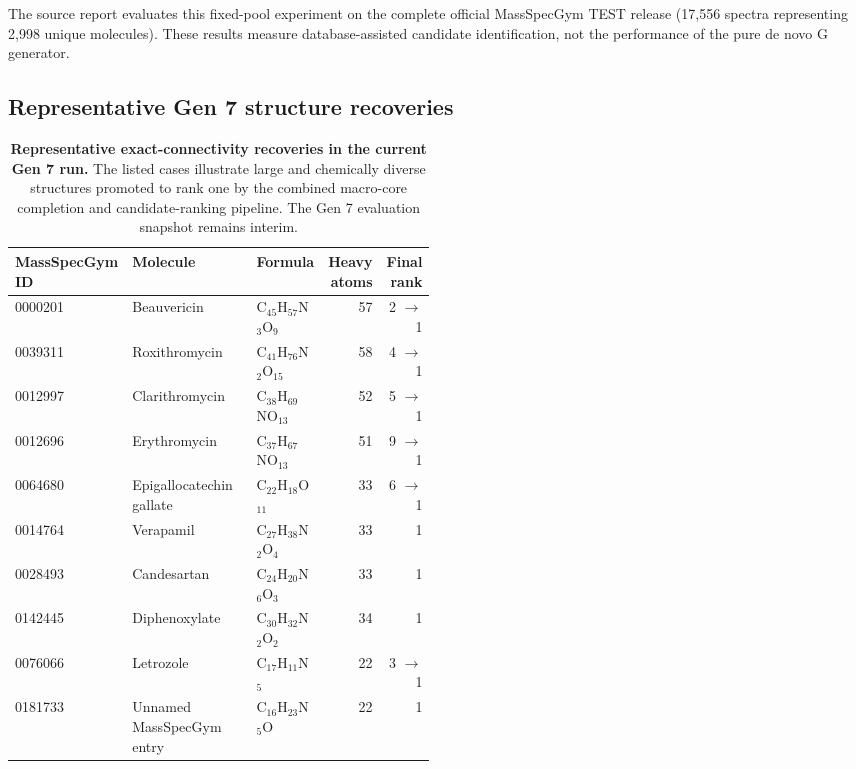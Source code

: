The source report evaluates this fixed-pool experiment on the complete official
MassSpecGym TEST release (17,556 spectra representing 2,998 unique molecules).
These results measure database-assisted candidate identification, not the
performance of the pure de novo G generator.

\subsection{Representative Gen 7 structure recoveries}

\begin{table}[!htbp]
\centering
\caption{\textbf{Representative exact-connectivity recoveries in the current Gen 7 run.}
The listed cases illustrate large and chemically diverse structures promoted to
rank one by the combined macro-core completion and candidate-ranking pipeline.
The Gen 7 evaluation snapshot remains interim.}
\label{tab:gen7_landmark_cases}
\small
\setlength{\tabcolsep}{2.5pt}

\begin{tabular}{@{}p{0.19\linewidth}p{0.30\linewidth}lrr@{}}
\toprule
MassSpecGym ID & Molecule & Formula & Heavy atoms & Final rank \\
\midrule
0000201 & Beauvericin & C$_{45}$H$_{57}$N$_3$O$_9$ & 57 & 2 $\rightarrow$ 1 \\
0039311 & Roxithromycin & C$_{41}$H$_{76}$N$_2$O$_{15}$ & 58 & 4 $\rightarrow$ 1 \\
0012997 & Clarithromycin & C$_{38}$H$_{69}$NO$_{13}$ & 52 & 5 $\rightarrow$ 1 \\
0012696 & Erythromycin & C$_{37}$H$_{67}$NO$_{13}$ & 51 & 9 $\rightarrow$ 1 \\
0064680 & Epigallocatechin gallate & C$_{22}$H$_{18}$O$_{11}$ & 33 & 6 $\rightarrow$ 1 \\
0014764 & Verapamil & C$_{27}$H$_{38}$N$_2$O$_4$ & 33 & 1 \\
0028493 & Candesartan & C$_{24}$H$_{20}$N$_6$O$_3$ & 33 & 1 \\
0142445 & Diphenoxylate & C$_{30}$H$_{32}$N$_2$O$_2$ & 34 & 1 \\
0076066 & Letrozole & C$_{17}$H$_{11}$N$_5$ & 22 & 3 $\rightarrow$ 1 \\
0181733 & Unnamed MassSpecGym entry & C$_{16}$H$_{23}$N$_5$O & 22 & 1 \\
\bottomrule
\end{tabular}
\end{table}


